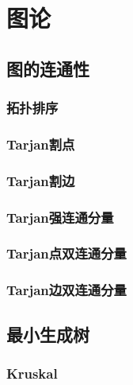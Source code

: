 \section{图论}
\subsection{图的连通性}
\subsubsection{拓扑排序}


\subsubsection{Tarjan割点}


\subsubsection{Tarjan割边}


\subsubsection{Tarjan强连通分量}


\subsubsection{Tarjan点双连通分量}


\subsubsection{Tarjan边双连通分量}


\subsection{最小生成树}
\subsubsection{Kruskal}


